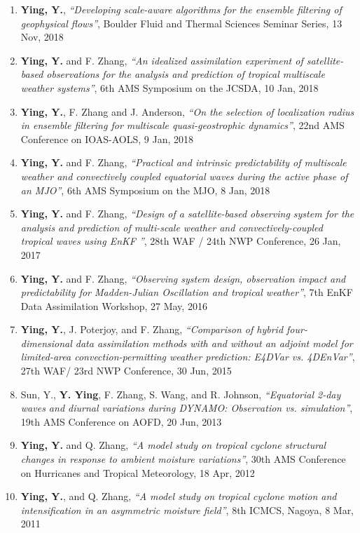\begin{enumerate}
\item \textbf{Ying, Y.}, \textit{``Developing scale-aware algorithms for the ensemble filtering of geophysical flows''}, Boulder Fluid and Thermal Sciences Seminar Series, 13 Nov, 2018

\item \textbf{Ying, Y.} and F. Zhang, \textit{``An idealized assimilation experiment of satellite-based observations for the analysis and prediction of tropical multiscale weather systems''}, 6th AMS Symposium on the JCSDA, 10 Jan, 2018

\item \textbf{Ying, Y.}, F. Zhang and J. Anderson, \textit{``On the selection of localization radius in ensemble filtering for multiscale quasi-geostrophic dynamics''}, 22nd AMS Conference on IOAS-AOLS,  9 Jan, 2018

\item \textbf{Ying, Y.} and F. Zhang, \textit{``Practical and intrinsic predictability of multiscale weather and convectively coupled equatorial waves during the active phase of an MJO''}, 6th AMS Symposium on the MJO,  8 Jan, 2018

\item \textbf{Ying, Y.} and F. Zhang, \textit{``Design of a satellite-based observing system for the analysis and prediction of multi-scale weather and convectively-coupled tropical waves using EnKF ''}, 28th WAF / 24th NWP Conference, 26 Jan, 2017

\item \textbf{Ying, Y.} and F. Zhang, \textit{``Observing system design, observation impact and predictability for Madden-Julian Oscillation and tropical weather''}, 7th EnKF Data Assimilation Workshop, 27 May, 2016

\item \textbf{Ying, Y.}, J. Poterjoy, and F. Zhang, \textit{``Comparison of hybrid four-dimensional data assimilation methods with and without an adjoint model for limited-area convection-permitting weather prediction: E4DVar vs. 4DEnVar''}, 27th WAF/ 23rd NWP Conference, 30 Jun, 2015

\item Sun, Y., \textbf{Y. Ying}, F. Zhang, S. Wang, and R. Johnson, \textit{``Equatorial 2-day waves and diurnal variations during DYNAMO: Observation vs. simulation''}, 19th AMS Conference on AOFD, 20 Jun, 2013

\item \textbf{Ying, Y.} and Q. Zhang, \textit{``A model study on tropical cyclone structural changes in response to ambient moisture variations''}, 30th AMS Conference on Hurricanes and Tropical Meteorology, 18 Apr, 2012

\item \textbf{Ying, Y.}, and Q. Zhang, \textit{``A model study on tropical cyclone motion and intensification in an asymmetric moisture field''}, 8th ICMCS, Nagoya,  8 Mar, 2011

\end{enumerate}
